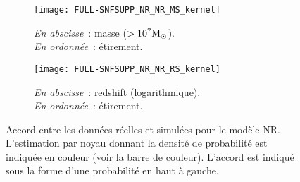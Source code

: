 \documentclass[../main/main.tex]{subfiles}
\begin{document}
\begin{figure}[ht]
    \centering
    \begin{subfigure}[]{.48\linewidth}
        \centering
        \texttt{[image: FULL-SNFSUPP\_NR\_NR\_MS\_kernel]}
        \caption[Accord entre données réelles et simulées pour les paramètres de
        masse et d'étirement]{\footnotesize\textit{En abscisse}~: masse
        ($> 10^7\si{\Msun}$).\\\hspace*{15.5pt}
        \textit{En ordonnée}~: étirement.}
        \label{fig:hexnrms}
    \end{subfigure}
    \hfill
    \begin{subfigure}[]{.48\linewidth}
        \centering
        \texttt{[image: FULL-SNFSUPP\_NR\_NR\_RS\_kernel]}
        \caption[Accord entre données réelles et simulées pour les paramètres de
        redshift et d'étirement]{\footnotesize\textit{En abscisse}~: redshift
        (logarithmique).\\\hspace*{15.5pt}
    \textit{En ordonnée}~: étirement.}
        \label{fig:hexnrrs}
    \end{subfigure}
    \caption[Accord entre les données réelles et simulées pour le modèle
    NR]{Accord entre les données réelles et simulées pour le modèle NR.
        L'estimation par noyau donnant la densité de probabilité est indiquée en
        couleur (voir la barre de couleur). L'accord est indiqué sous la forme
    d'une probabilité en haut à gauche.}
    \label{fig:2dhex}
\end{figure}
\end{document}
